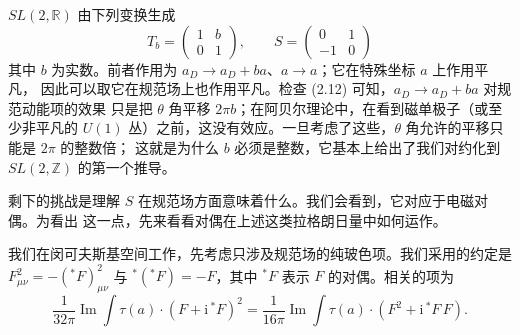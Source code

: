 \documentclass[11pt,a4paper,UTF8,fontset=fandol]{ctexart}
\theoremstyle{plain}
\theoremstyle{definition}
\newcommand{\R}{\mathbb{R}}
\newcommand{\Z}{\mathbb{Z}}
\newcommand{\ii}{\mathrm{i}}
\renewcommand{\Im}{\operatorname{Im}}
\newcommand{\Ll}{\mathcal{L}}
\begin{document}
$SL(2,\R)$ 由下列变换生成
\begin{equation}
  T_b=\begin{pmatrix} 1 & b \\ 0 & 1 \end{pmatrix},\qquad
  S=\begin{pmatrix} 0 & 1 \\ -1 & 0 \end{pmatrix} \tag{3.11}
\end{equation}
其中 $b$ 为实数。前者作用为 $a_D\to a_D+ba$、$a\to a$；它在特殊坐标 $a$ 上作用平凡，
因此可以取它在规范场上也作用平凡。检查 (2.12) 可知，$a_D\to a_D+ba$ 对规范动能项的效果
只是把 $\theta$ 角平移 $2\pi b$；在阿贝尔理论中，在看到磁单极子（或至少非平凡的 $U(1)$
丛）之前，这没有效应。一旦考虑了这些，$\theta$ 角允许的平移只能是 $2\pi$ 的整数倍；
这就是为什么 $b$ 必须是整数，它基本上给出了我们对约化到 $SL(2,\Z)$ 的第一个推导。

剩下的挑战是理解 $S$ 在规范场方面意味着什么。我们会看到，它对应于电磁对偶。为看出
这一点，先来看看对偶在上述这类拉格朗日量中如何运作。

我们在闵可夫斯基空间工作，先考虑只涉及规范场的纯玻色项。我们采用的约定是
$F^2_{\mu\nu}=-(^{\ast}F)^2_{\mu\nu}$ 与 $^{\ast}(^{\ast}F)=-F$，其中 $^{\ast}F$ 表示 $F$
的对偶。相关的项为
\begin{equation}
  \frac{1}{32\pi}\Im\int\tau(a)\cdot(F+\ii\,^{\ast}F)^2
  =\frac{1}{16\pi}\Im\int\tau(a)\cdot(F^2+\ii\,^{\ast}F\,F). \tag{3.12}
\end{equation}
\end{document}
